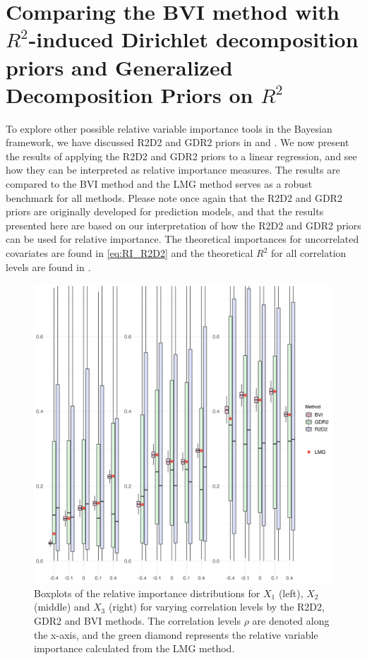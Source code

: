 \section{Comparing the BVI method with $R^2$-induced Dirichlet decomposition priors and Generalized Decomposition Priors on $R^2$}
To explore other possible relative variable importance tools in the Bayesian framework, we have discussed R2D2 and GDR2 priors in  and . We now present the results of applying the R2D2 and GDR2 priors to a linear regression, and see how they can be interpreted as relative importance measures. The results are compared to the BVI method and the LMG method serves as a robust benchmark for all methods. Please note once again that the R2D2 and GDR2 priors are originally developed for prediction models, and that the results presented here are based on our interpretation of how the R2D2 and GDR2 priors can be used for relative importance. The theoretical importances for uncorrelated covariates are found in \eqref{eq:RI_R2D2} and the theoretical $R^2$ for all correlation levels are found in . 
\begin{figure}[H]%
  \centering
  \includegraphics[width=1\linewidth]{Figures/R2D2_BVI_Comparison/R2D2_BVI_boxplot.png}
  \caption[Comparison of the relative importance from the BVI method and the shrinkage prior methods]{Boxplots of the relative importance distributions for $X_1$ (left), $X_2$ (middle) and $X_3$ (right) for varying correlation levels by the R2D2, GDR2 and BVI methods. The correlation levels $\rho$ are denoted along the x-axis, and the green diamond represents the relative variable importance calculated from the LMG method.}
  \label{fig:r2d2_importance}
\end{figure}
